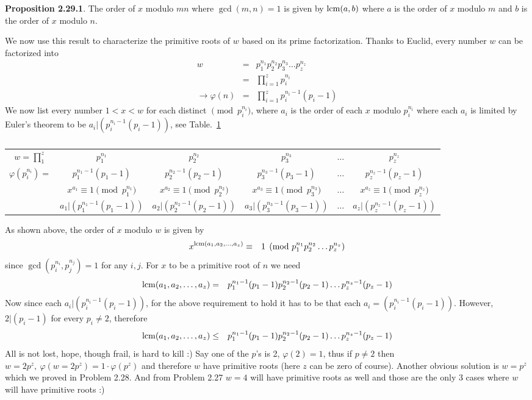 \documentclass[aps,preprint,preprintnumbers,nofootinbib,showpacs,prd]{revtex4-1}
\newcommand{\nbea}{\begin{eqnarray*}}
\newcommand{\neea}{\end{eqnarray*}}
\begin{document}
{\bf Proposition 2.29.1}. The order of $x$ modulo $mn$ where $\gcd(m,n) = 1$ is given by ${\rm lcm}(a,b)$ where $a$ is the order of $x$ modulo $m$ and $b$ is the order of $x$ modulo $n$.

We now use this result to characterize the primitive roots of $w$ based on its prime factorization. Thanks to Euclid, every number $w$ can be factorized into
%
\nbea
w & = & p_1^{n_1}p_2^{n_2}p_3^{n_3} \dots p_z^{n_z} \\
& = & \prod_{i=1}^{z} p_i^{n_i} \\
\to \varphi(n) & = & \prod_{i=1}^{z} p_i^{n_i-1}(p_i - 1)
\neea
%
We now list every number $1 < x < w$ for each distinct $\pmod{p_i^{n_i}}$, where $a_i$ is the order of each $x$ modulo $p_i^{n_i}$ where each $a_i$ is limited by Euler's theorem to be $a_i|(p_i^{n_i-1}(p_i-1))$, see Table.~\ref{Tab:2}
%
\begin{table}[]
\centering
\caption{}
\label{Tab:2}
\begin{tabular}{|c|c|c|c c c|}
\hline
$w=\prod_{1}^{z}$ & $p_1^{n_1}$ & $p_2^{n_2}$ & $p_3^{n_3}$ & $\dots$ & $p_z^{n_z}$ \\
$\varphi(p_i^{n_i}) = $ & $p_1^{n_1-1}(p_1-1)$ & $p_2^{n_2-1}(p_2-1)$ & $p_3^{n_3-1}(p_3-1)$ & $\dots$ & $p_z^{n_z-1}(p_z-1)$ \\ \hline 
 & $x^{a_1} \equiv 1 \pmod{p_1^{n_1}}$ & $x^{a_2} \equiv 1 \pmod{p_2^{n_2}}$ & $x^{a_3} \equiv 1 \pmod{p_3^{n_3}}$ & $\dots$ & $x^{a_z} \equiv 1 \pmod{p_z^{n_z}}$ \\
 & $a_1|(p_1^{n_1-1}(p_1-1))$ & $a_2|(p_2^{n_2-1}(p_2-1))$ & $a_3|(p_3^{n_3-1}(p_3-1))$ & $\dots$ & $a_z|(p_z^{n_z-1}(p_z-1))$ \\ \hline
\end{tabular}
\end{table}
%
As shown above, the order of $x$ modulo $w$ is given by
%
\nbea
x^{{\rm lcm}(a_1, a_2, \dots, a_z)} & \equiv & 1 \pmod{p_1^{n_1}p_2^{n_2} \dots p_z^{n_z}}
\neea
%
since $\gcd(p_i^{n_i},p_j^{n_j}) = 1$ for any $i, j$. For $x$ to be a primitive root of $n$ we need
%
\nbea
{\rm lcm}(a_1, a_2, \dots, a_z) & = & p_1^{n_1-1}(p_1 - 1)p_2^{n_2-1}(p_2 - 1) \dots p_z^{n_z-1}(p_z - 1)
\neea
%
Now since each $a_i|(p_i^{n_i-1}(p_i-1))$, for the above requirement to hold it has to be that each $a_i = (p_i^{n_i-1}(p_i-1))$. However, $2|(p_i-1)$ for every $p_i \neq 2$, therefore
%
\nbea
{\rm lcm}(a_1, a_2, \dots, a_z) & \le & p_1^{n_1-1}(p_1 - 1)p_2^{n_2-1}(p_2 - 1) \dots p_z^{n_z-1}(p_z - 1)
\neea
%
All is not lost, hope, though frail, is hard to kill :) Say one of the $p$'s is 2, $\varphi(2)=1$, thus if $p \neq 2$ then $w = 2 p^z, ~\varphi(w=2 p^z) = 1 \cdot \varphi(p^z)$ and therefore $w$ have primitive roots (here $z$ can be zero of course). Another obvious solution is $w=p^z$ which we proved in Problem 2.28. And from Problem 2.27 $w=4$ will have primitive roots as well and those are the only 3 cases where $w$ will have primitive roots :)
\end{document}
